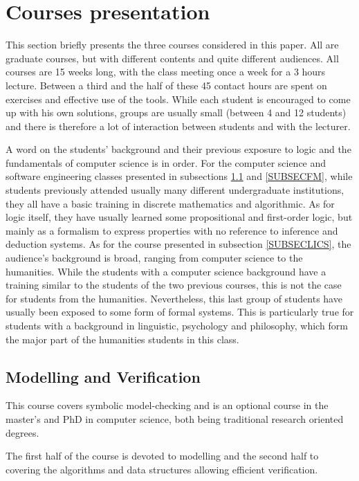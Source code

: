 \documentclass[a4paper,UKenglish]{lipics}
\begin{document}
\section{Courses presentation}\label{SECCP}
This section briefly presents the three courses considered in this paper. All are graduate courses, but with different contents and quite different audiences. All courses are 15 weeks long, with the class meeting once a week for a 3 hours lecture. Between a third and the half of these 45 contact hours are spent on exercises and effective use of the tools. While each student is encouraged to come up with his own solutions, groups are usually small (between 4 and 12 students) and there is therefore a lot of interaction between students and with the lecturer.

A word on the students' background and their previous exposure to logic and the fundamentals of computer science is in order. For the computer science and software engineering classes presented in subsections \ref{SUBSECMV} and \ref{SUBSECFM}, while students previously attended usually many different undergraduate institutions, they all have a basic training in discrete mathematics and algorithmic. As for logic itself, they have usually learned some propositional and first-order logic, but mainly as a formalism to express properties with no reference to inference and deduction systems. As for the course presented in subsection \ref{SUBSECLICS}, the audience's background is broad, ranging from computer science to the humanities. While the students with a computer science background have a training similar to the students of the two previous courses, this is not the case for students from the humanities. Nevertheless, this last group of students have usually been exposed to some form of formal systems. This is particularly true for students with a background in linguistic, psychology and philosophy, which form the major part of the humanities students in this class.

\subsection{Modelling and Verification}\label{SUBSECMV}
This course covers symbolic model-checking \cite{cemgopdaMIT00} and is an optional course in the master's and PhD in computer science, both being traditional research oriented degrees.

The first half of the course is devoted to modelling and the second half to covering the algorithms and data structures allowing efficient verification. 
\end{document}
